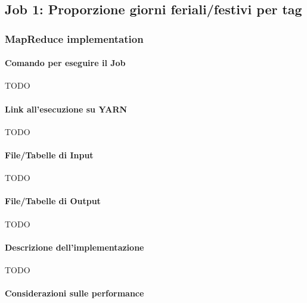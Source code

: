 

\subsection{Job 1: Proporzione giorni feriali/festivi per tag}\label{subsec:job1}

  \subsubsection{MapReduce implementation}\label{subsub:job1:mapreduce}

  \paragraph{Comando per eseguire il Job}\label{par:job1:mapreduce:cmd}

  TODO

  \paragraph{Link all’esecuzione su YARN}\label{par:job1:mapreduce:yarn}

  TODO

  \paragraph{File/Tabelle di Input}\label{par:job1:mapreduce:input}

  TODO

  \paragraph{File/Tabelle di Output}\label{par:job1:mapreduce:output}

  TODO

  \paragraph{Descrizione dell’implementazione}\label{par:job1:mapreduce:implementation}

  TODO

  \paragraph{Considerazioni sulle performance}\label{par:job1:mapreduce:performance}

